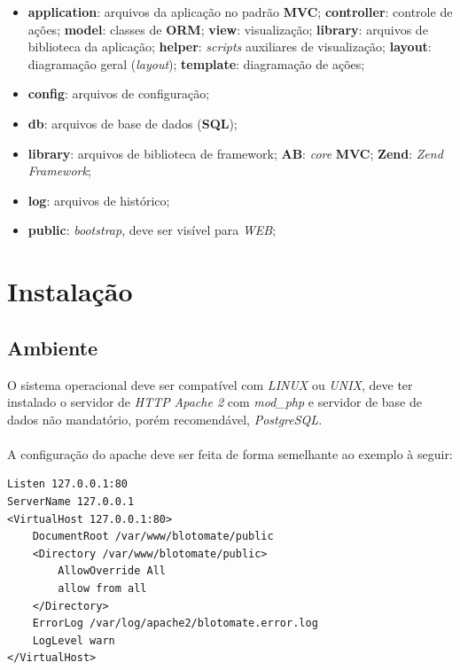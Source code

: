 \documentclass[a4paper,12pt]{article}
\begin{document}
\begin{itemize}
\item \textbf{application}: arquivos da aplicação no padrão \textbf{MVC};
\subitem \textbf{controller}: controle de ações;
\subitem \textbf{model}: classes de \textbf{ORM};
\subitem \textbf{view}: visualização;
\subitem \textbf{library}: arquivos de biblioteca da aplicação;
\subsubitem \textbf{helper}: \emph{scripts} auxiliares de visualização;
\subsubitem \textbf{layout}: diagramação geral (\emph{layout});
\subsubitem \textbf{template}: diagramação de ações;
\item \textbf{config}: arquivos de configuração;
\item \textbf{db}: arquivos de base de dados (\textbf{SQL});
\item \textbf{library}: arquivos de biblioteca de framework;
\subitem \textbf{AB}: \emph{core} \textbf{MVC};
\subitem \textbf{Zend}: \emph{Zend Framework};
\item \textbf{log}: arquivos de histórico;
\item \textbf{public}: \emph{bootstrap}, deve ser visível para \emph{WEB};
\end{itemize}


\section{Instalação}

\subsection{Ambiente}
O sistema operacional deve ser compatível com \emph{LINUX} ou \emph{UNIX}, deve ter instalado o servidor de \emph{HTTP} \emph{Apache 2} com \emph{mod\_php} e servidor de base de dados não mandatório, porém recomendável, \emph{PostgreSQL}.

\paragraph{}
A configuração do apache deve ser feita de forma semelhante ao exemplo à seguir:

\begin{verbatim}
Listen 127.0.0.1:80
ServerName 127.0.0.1
<VirtualHost 127.0.0.1:80>
    DocumentRoot /var/www/blotomate/public
    <Directory /var/www/blotomate/public>
        AllowOverride All
        allow from all
    </Directory>
    ErrorLog /var/log/apache2/blotomate.error.log
    LogLevel warn
</VirtualHost>
\end{verbatim}
\end{document}
